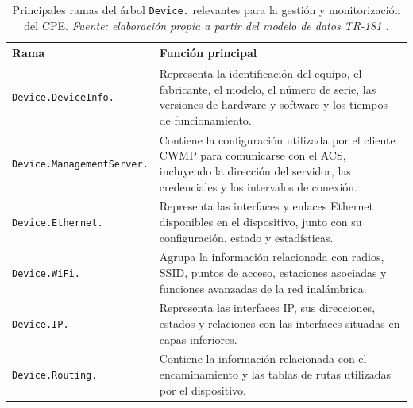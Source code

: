 \begin{table}[H]
    \centering
    \small
    \renewcommand{\arraystretch}{1.35}

    \caption[Principales ramas del árbol \texttt{Device.}]
    {Principales ramas del árbol \texttt{Device.} relevantes para la
    gestión y monitorización del CPE.
    \textit{Fuente: elaboración propia a partir del modelo de datos
    TR-181 \cite{bbf_tr181}.}}

    \label{tab:principales-ramas-device}

    \begin{tabular}{
        p{}
        p{}
    }
        \hline
        \textbf{Rama}
        &
        \textbf{Función principal}
        \\
        \hline

        \texttt{Device.DeviceInfo.}
        &
        Representa la identificación del equipo, el fabricante, el
        modelo, el número de serie, las versiones de hardware y software
        y los tiempos de funcionamiento.
        \\

        \texttt{Device.ManagementServer.}
        &
        Contiene la configuración utilizada por el cliente CWMP para
        comunicarse con el ACS, incluyendo la dirección del servidor,
        las credenciales y los intervalos de conexión.
        \\

        \texttt{Device.Ethernet.}
        &
        Representa las interfaces y enlaces Ethernet disponibles en el
        dispositivo, junto con su configuración, estado y estadísticas.
        \\

        \texttt{Device.WiFi.}
        &
        Agrupa la información relacionada con radios, SSID, puntos de
        acceso, estaciones asociadas y funciones avanzadas de la red
        inalámbrica.
        \\

        \texttt{Device.IP.}
        &
        Representa las interfaces IP, sus direcciones, estados y
        relaciones con las interfaces situadas en capas inferiores.
        \\

        \texttt{Device.Routing.}
        &
        Contiene la información relacionada con el encaminamiento y las
        tablas de rutas utilizadas por el dispositivo.
        \\


\end{tabular}
\end{table}
